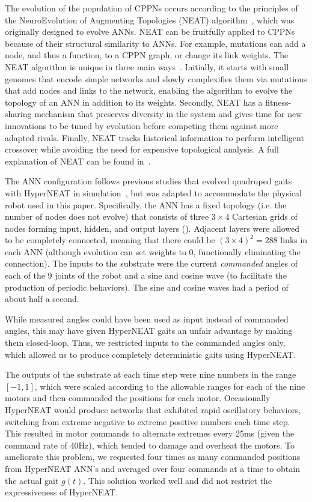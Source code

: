 The evolution of the population of CPPNs occurs according to the
principles of the NeuroEvolution of Augmenting Topologies (NEAT)
algorithm~\citep{stanley2002evolving}, which was originally designed to
evolve ANNs. NEAT can be fruitfully applied to CPPNs because of their
structural similarity to ANNs. For example, mutations can add a node,
and thus a function, to a CPPN graph, or change its link weights. The
NEAT algorithm is unique in three main
ways~\citep{stanley2002evolving}. Initially, it starts with small
genomes that encode simple networks and slowly complexifies them via
mutations that add nodes and links to the network, enabling the
algorithm to evolve the topology of an ANN in addition to its
weights. Secondly, NEAT has a fitness-sharing mechanism that preserves
diversity in the system and gives time for new innovations to be tuned
by evolution before competing them against more adapted
rivals. Finally, NEAT tracks historical information to perform
intelligent crossover while avoiding the need for expensive
topological analysis. A full explanation of NEAT can be found
in~\citep{stanley2002evolving}.
  
The ANN configuration follows previous studies that evolved quadruped
gaits with HyperNEAT in simulation~\citep{clune2011performance,
  clune2009evolving}, but was adapted to accommodate the physical robot used in this paper. Specifically, the ANN has a fixed topology (i.e. the number of nodes does not evolve) that consists of three $3 \times 4$
Cartesian grids of nodes forming input, hidden, and output
layers (). Adjacent layers were allowed to be completely connected, meaning that there
could be $(3 \times 4)^2= 288$ links in each ANN (although evolution can set weights to 0, functionally eliminating the connection). The inputs to the
substrate were the current \emph{commanded} angles of each of the 9 joints of the robot and a sine and cosine wave (to facilitate the
production of periodic behaviors).  The sine and cosine waves had a period of about half a second.

While measured angles could have been used as input instead of
commanded angles, this may have given HyperNEAT gaits an unfair
advantage by making them closed-loop. Thus, we restricted inputs to
the commanded angles only, which allowed us to produce completely
deterministic gaits using HyperNEAT.

The outputs of the substrate at each time step were nine numbers in
the range $[-1,1]$, which were scaled according to the allowable
ranges for each of the nine motors and then commanded
the positions for each motor.  Occasionally HyperNEAT would produce networks that
exhibited rapid oscillatory behaviors, switching from extreme negative to extreme positive numbers each time step.  This resulted in motor
commands to alternate extremes every 25ms (given the command rate of
40Hz), which tended to damage and overheat the motors.  To ameliorate
this problem, we requested four times as many commanded
positions from HyperNEAT ANN's and averaged over four commands at a time to
obtain the actual gait $g(t)$.  This solution worked well and did not restrict the expressiveness of HyperNEAT.

